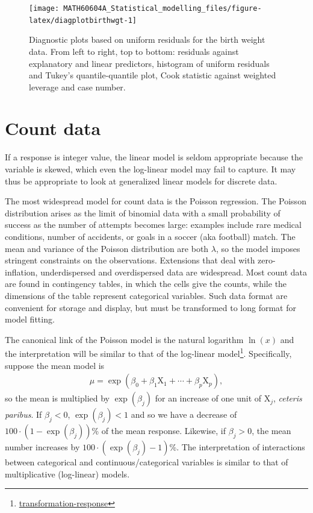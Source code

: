 \documentclass[
  11pt,
  letterpaper,
]{book}
\renewcommand{\href}[2]{#2\footnote{\url{#1}}}
\theoremstyle{definition}
\theoremstyle{definition}
\theoremstyle{definition}
\theoremstyle{remark}
\begin{document}
\begin{figure}

{\centering \texttt{[image: MATH60604A\_Statistical\_modelling\_files/figure-latex/diagplotbirthwgt-1]} 

}

\caption{Diagnostic plots based on uniform residuals for the birth weight data. From left to right, top to bottom: residuals against explanatory and linear predictors, histogram of uniform residuals and Tukey's quantile-quantile plot, Cook statistic against weighted leverage and case number. }\label{fig:diagplotbirthwgt}
\end{figure}

\hypertarget{count-data}{%
\section{Count data}\label{count-data}}

If a response is integer value, the linear model is seldom appropriate because the variable is skewed, which even the log-linear model may fail to capture. It may thus be appropriate to look at generalized linear models for discrete data.

The most widespread model for count data is the Poisson regression. The Poisson distribution arises as the limit of binomial data with a small probability of success as the number of attempts becomes large: examples include rare medical conditions, number of accidents, or goals in a soccer (aka football) match. The mean and variance of the Poisson distribution are both \(\lambda\), so the model imposes stringent constraints on the observations. Extensions that deal with zero-inflation, underdispersed and overdispersed data are widespread. Most count data are found in contingency tables, in which the cells give the counts, while the dimensions of the table represent categorical variables. Such data format are convenient for storage and display, but must be transformed to long format for model fitting.

The canonical link of the Poisson model is the natural logarithm \(\ln(x)\) and the interpretation will be similar to that of the \href{transformation-response}{log-linear model}. Specifically, suppose the mean model is
\begin{align*}
\mu = \exp(\beta_0 + \beta_1 \mathrm{X}_{1} + \cdots + \beta_p \mathrm{X}_{p}),
\end{align*}
so the mean is multiplied by \(\exp(\beta_j)\) for an increase of one unit of \(\mathrm{X}_{j}\), \emph{ceteris paribus}. If \(\beta_j < 0\), \(\exp(\beta_j) < 1\) and so we have a decrease of \(100\cdot(1-\exp(\beta_j))\)\% of the mean response. Likewise, if \(\beta_j>0\), the mean number increases by \(100\cdot(\exp(\beta_j)-1)\)\%. The interpretation of interactions between categorical and continuous/categorical variables is similar to that of multiplicative (log-linear) models.
\end{document}
